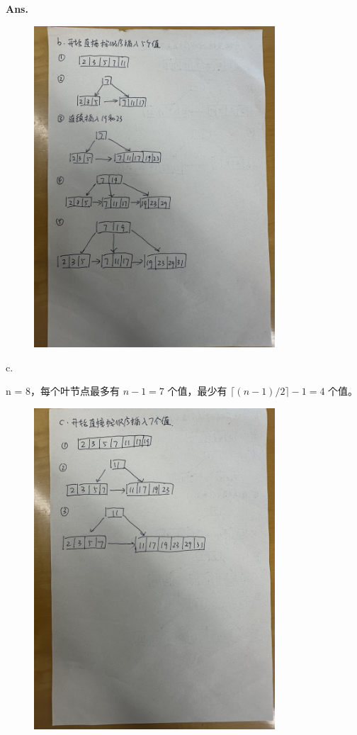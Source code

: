 \documentclass[12pt, a4paper, UTF8, fontset=windows]{ctexbook}
\newenvironment{solution}{\par\noindent\textbf{Ans.}}{\par}
\begin{document}
\begin{solution}
    \begin{figure}[htb]
        \centering
        \includegraphics[width=9cm, angle=-90]{../../src/images/hw4-Q2-b.jpg}
    \end{figure}


c.

n = 8，每个叶节点最多有 $n - 1 = 7$ 个值，最少有 $\lceil (n-1)/2 \rceil - 1 = 4$ 个值。

    \begin{figure}[htb]
        \centering
        \includegraphics[width=9cm, angle=-90]{../../src/images/hw4-Q2-c.jpg}
    \end{figure}

\end{solution}
\end{document}
